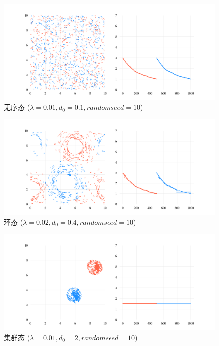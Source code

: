 \documentclass{article}
\begin{document}
\begin{figure}[H]
	\centering
	\includegraphics[width=\textwidth]{./figs/CorrectCoupling_uniform_0.010_0.10_10_radius.png}
	\vspace{-1cm}
	\caption{无序态 ($\lambda=0.01, d_0=0.1, random seed=10$)}
	\label{fig:fig22.1}
\end{figure}

\vspace{-1cm}

\begin{figure}[H]
	\centering
	\includegraphics[width=\textwidth]{./figs/CorrectCoupling_uniform_0.020_0.40_10_radius.png}
	\vspace{-1cm}
	\caption{环态 ($\lambda=0.02, d_0=0.4, random seed=10$)}
	\label{fig:fig22.2}
\end{figure}

\vspace{-1cm}

\begin{figure}[H]
	\centering
	\includegraphics[width=\textwidth]{./figs/CorrectCoupling_uniform_0.010_2.00_10_radius.png}
	\vspace{-1cm}
	\caption{集群态 ($\lambda=0.01, d_0=2, random seed=10$)}
	\label{fig:fig22.3}
\end{figure}
\end{document}
